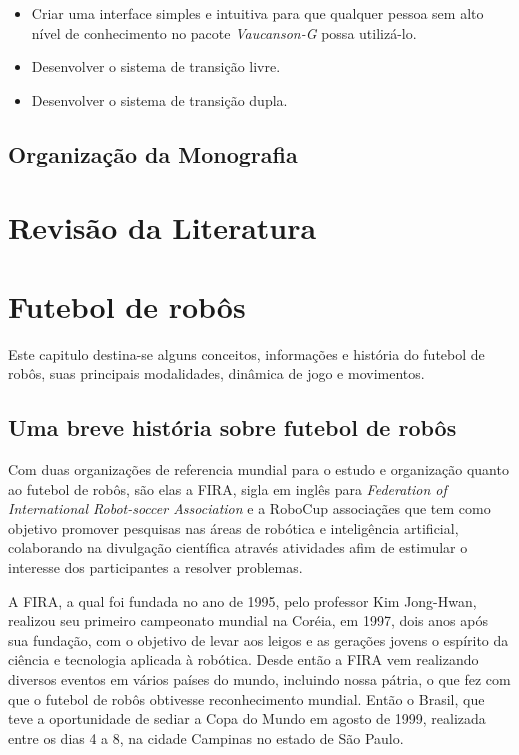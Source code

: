 \documentclass[a4paper,12pt,portuguese]{ufms-cpcx}
\begin{document}
\begin{itemize}
	
	\item Criar uma interface simples e intuitiva para que qualquer pessoa sem alto nível de conhecimento no pacote \textit{Vaucanson-G} possa utilizá-lo.
	
	\item Desenvolver o sistema de transição livre.
	
	\item Desenvolver o sistema de transição dupla.
	
	
\end{itemize}

\section {Organização da Monografia}

\chapter{Revisão da Literatura}

\chapter{Futebol de robôs}
Este capitulo destina-se alguns conceitos, informações e história do futebol de robôs, suas principais modalidades, dinâmica de jogo e movimentos.

\section{Uma breve história sobre futebol de robôs}
Com duas organizações de referencia mundial para o estudo e organização quanto ao futebol de robôs, são elas a FIRA, sigla em inglês para \textit{Federation of International Robot-soccer Association} e a RoboCup associaçães que tem como objetivo promover pesquisas nas áreas de robótica e inteligência artificial, colaborando na divulgação científica através atividades afim de estimular o interesse dos participantes a resolver problemas. 

A FIRA, a qual foi fundada no ano de 1995, pelo professor Kim Jong-Hwan, realizou seu primeiro campeonato mundial na Coréia, em 1997, dois anos após sua fundação, com o objetivo de levar aos leigos e as gerações jovens o espírito da ciência e tecnologia aplicada à robótica. Desde então a FIRA vem realizando diversos eventos em vários
países do mundo, incluindo nossa pátria, o que fez com que o futebol de robôs obtivesse reconhecimento mundial. Então o Brasil, que teve a oportunidade de sediar a Copa do Mundo em agosto de 1999, realizada entre os dias 4 a 8, na cidade Campinas no estado de São Paulo.
\end{document}
